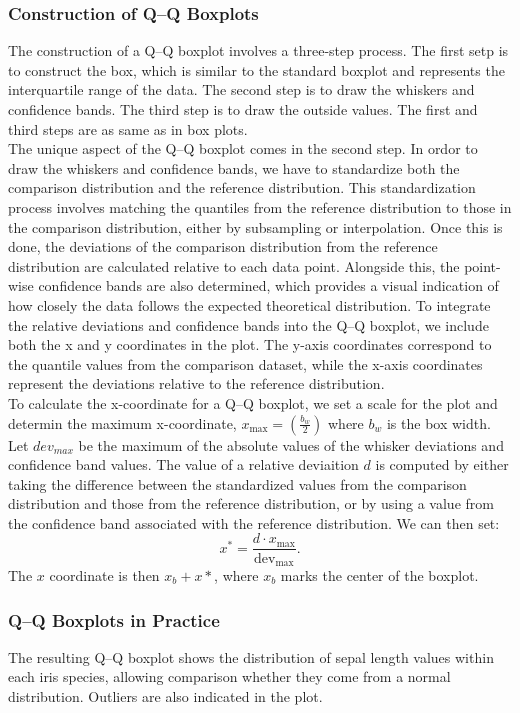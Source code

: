 \documentclass{article}\usepackage[]{graphicx}\usepackage[]{xcolor}
\numberwithin{equation}{section}
\begin{document}
\subsubsection{Construction of Q–Q Boxplots}
The construction of a Q–Q boxplot involves a three-step process\cite{rodu2022q}. The first setp is to construct the box, which is similar to the standard boxplot and represents the interquartile range of the data. The second step is to draw the whiskers and confidence bands. The third step is to draw the outside values. The first and third steps are as same as in box plots.\\

\noindent
The unique aspect of the Q–Q boxplot comes in the second step. In ordor to draw the whiskers and confidence bands, we have to standardize both the comparison distribution and the reference distribution. This standardization process involves matching the quantiles from the reference distribution to those in the comparison distribution, either by subsampling or interpolation. Once this is done, the deviations of the comparison distribution from the reference distribution are calculated relative to each data point. Alongside this, the point-wise confidence bands are also determined, which provides a visual indication of how closely the data follows the expected theoretical distribution. To integrate the relative deviations and confidence bands into the Q–Q boxplot, we include both the x and y coordinates in the plot. The y-axis coordinates correspond to the quantile values from the comparison dataset, while the x-axis coordinates represent the deviations relative to the reference distribution.\\

\noindent
To calculate the x-coordinate for a Q–Q boxplot, we set a scale for the plot and determin the maximum x-coordinate, $x_{\text{max}}=(\frac{b_w}{2})$ where $b_w$ is the box width. Let $dev_{max}$ be the maximum of the absolute values of the whisker deviations and confidence band values. The value of a relative deviaition $d$ is computed by either taking the difference between the standardized values from the comparison distribution and those from the reference distribution, or by using a value from the confidence band associated with the reference distribution. We can then set:
$$x^* = \frac{d \cdot x_{\text{max}}}{\text{dev}_{\text{max}}}.$$
The $x$ coordinate is then $x_b+x*$, where $x_b$ marks the center of the boxplot.


\subsubsection{Q–Q Boxplots in Practice}
The resulting Q–Q boxplot shows the distribution of sepal length values within each iris species, allowing comparison whether they come from a normal distribution. Outliers are also indicated in the plot.\\
\end{document}
